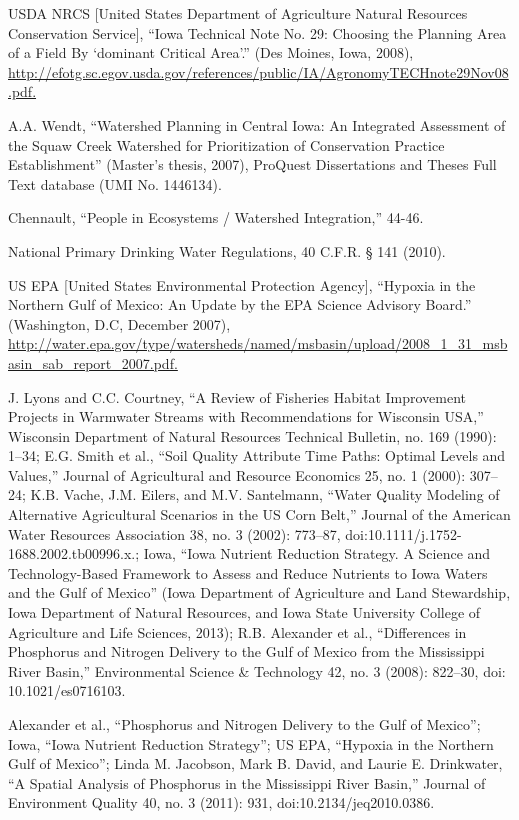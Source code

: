 \documentclass[11pt]{article}
\begin{document}
\begin{itemize}
\begin{thebibliography}{1}
   USDA NRCS [United States Department of Agriculture Natural Resources Conservation Service], “Iowa Technical Note No. 29: Choosing the Planning Area of a Field By ‘dominant Critical Area’.” (Des Moines, Iowa, 2008), \url{http://efotg.sc.egov.usda.gov/references/public/IA/AgronomyTECHnote29Nov08.pdf.}
  
   A.A. Wendt, “Watershed Planning in Central Iowa: An Integrated Assessment of the Squaw Creek Watershed for Prioritization of Conservation Practice Establishment” (Master’s thesis, 2007), ProQuest Dissertations and Theses Full Text database (UMI No. 1446134).
  
   Chennault, “People in Ecosystems / Watershed Integration,” 44-46.
  
   National Primary Drinking Water Regulations, 40 C.F.R. § 141 (2010).
  
   US EPA [United States Environmental Protection Agency], “Hypoxia in the Northern Gulf of Mexico: An Update by the EPA Science Advisory Board.” (Washington, D.C, December 2007), \url{http://water.epa.gov/type/watersheds/named/msbasin/upload/2008_1_31_msbasin_sab_report_2007.pdf.}
  
     J. Lyons and C.C. Courtney, “A Review of Fisheries Habitat Improvement Projects in Warmwater Streams with Recommendations for Wisconsin USA,” Wisconsin Department of Natural Resources Technical Bulletin, no. 169 (1990): 1–34; E.G. Smith et al., “Soil Quality Attribute Time Paths: Optimal Levels and Values,” Journal of Agricultural and Resource Economics 25, no. 1 (2000): 307–24; K.B. Vache, J.M. Eilers, and M.V. Santelmann, “Water Quality Modeling of Alternative Agricultural Scenarios in the US Corn Belt,” Journal of the American Water Resources Association 38, no. 3 (2002): 773–87, doi:10.1111/j.1752-1688.2002.tb00996.x.; Iowa, “Iowa Nutrient Reduction Strategy. A Science and Technology-Based Framework to Assess and Reduce Nutrients to Iowa Waters and the Gulf of Mexico” (Iowa Department of Agriculture and Land Stewardship, Iowa Department of Natural Resources, and Iowa State University College of Agriculture and Life Sciences, 2013); R.B. Alexander et al., “Differences in Phosphorus and Nitrogen Delivery to the Gulf of Mexico from the Mississippi River Basin,” Environmental Science & Technology 42, no. 3 (2008): 822–30, doi: 10.1021/es0716103.
  
    Alexander et al., “Phosphorus and Nitrogen Delivery to the Gulf of Mexico”; Iowa, “Iowa Nutrient Reduction Strategy”; US EPA, “Hypoxia in the Northern Gulf of Mexico”; Linda M. Jacobson, Mark B. David, and Laurie E. Drinkwater, “A Spatial Analysis of Phosphorus in the Mississippi River Basin,” Journal of Environment Quality 40, no. 3 (2011): 931, doi:10.2134/jeq2010.0386.
  

\end{thebibliography}
\end{itemize}
\end{document}
